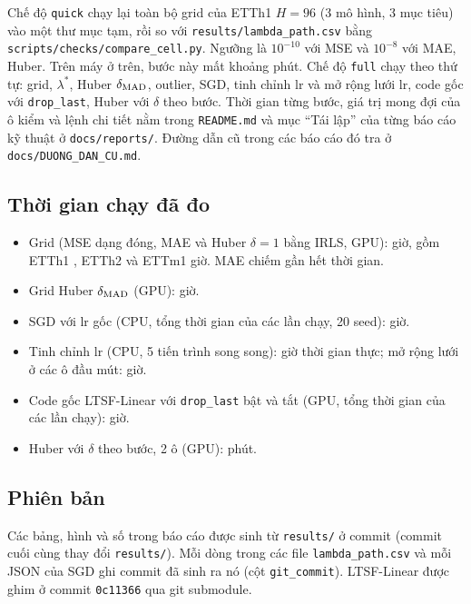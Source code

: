 Chế độ \texttt{quick} chạy lại toàn bộ grid của ETTh1 $H = 96$ (3 mô hình, 3 mục tiêu) vào một thư mục tạm, rồi so với \texttt{results/lambda\_path.csv} bằng \texttt{scripts/checks/compare\_cell.py}. Ngưỡng là $10^{-10}$ với MSE và $10^{-8}$ với MAE, Huber. Trên máy ở trên, bước này mất khoảng \nmReproCheckCellMinutes{} phút. Chế độ \texttt{full} chạy theo thứ tự: grid, $\lambda^*$, Huber $\delta_{\mathrm{MAD}}$, outlier, SGD, tinh chỉnh lr và mở rộng lưới lr, code gốc với \texttt{drop\_last}, Huber với $\delta$ theo bước. Thời gian từng bước, giá trị mong đợi của ô kiểm và lệnh chi tiết nằm trong \texttt{README.md} và mục ``Tái lập'' của từng báo cáo kỹ thuật ở \texttt{docs/reports/}. Đường dẫn cũ trong các báo cáo đó tra ở \texttt{docs/DUONG\_DAN\_CU.md}.

\subsection{Thời gian chạy đã đo}

\begin{itemize}
    \item Grid (MSE dạng đóng, MAE và Huber $\delta = 1$ bằng IRLS, GPU): \nmReproGridHours{} giờ, gồm ETTh1 \nmReproGridHoursETThOne, ETTh2 \nmReproGridHoursETThTwo{} và ETTm1 \nmReproGridHoursETTmOne{} giờ. MAE chiếm gần hết thời gian.
    \item Grid Huber $\delta_{\mathrm{MAD}}$ (GPU): \nmReproHuberMadHours{} giờ.
    \item SGD với lr gốc (CPU, tổng thời gian của các lần chạy, 20 seed): \nmReproSgdCpuHours{} giờ.
    \item Tinh chỉnh lr (CPU, 5 tiến trình song song): \nmReproSgdLrWallHours{} giờ thời gian thực; mở rộng lưới ở các ô đầu mút: \nmTunedLrExtWallHours{} giờ.
    \item Code gốc LTSF-Linear với \texttt{drop\_last} bật và tắt (GPU, tổng thời gian của các lần chạy): \nmReproDropGpuHours{} giờ.
    \item Huber với $\delta$ theo bước, 2 ô (GPU): \nmReproDeltaHMinutes{} phút.
\end{itemize}

\subsection{Phiên bản}

Các bảng, hình và số trong báo cáo được sinh từ \texttt{results/} ở commit \nmReproHead{} (commit cuối cùng thay đổi \texttt{results/}). Mỗi dòng trong các file \texttt{lambda\_path.csv} và mỗi JSON của SGD ghi commit đã sinh ra nó (cột \texttt{git\_commit}). LTSF-Linear được ghim ở commit \texttt{0c11366} qua git submodule.
